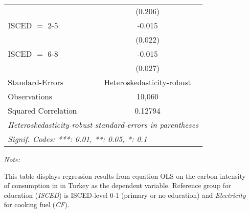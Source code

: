 \begin{table}[htbp!]
\begin{adjustbox}{width = 1\textwidth, max height = 0.95\textheight, center}
\begin{threeparttable}[b]
\begin{tabular}{lc}
                                & (0.206)\\   
            ISCED $=$ 2-5       & -0.015\\   
                                & (0.022)\\   
            ISCED $=$ 6-8       & -0.015\\   
                                & (0.027)\\   
            \midrule 
            Standard-Errors     & Heteroskedasticity-robust \\   
            Observations        & 10,060\\  
            Squared Correlation & 0.12794\\  
            \midrule \midrule
            \multicolumn{2}{l}{\emph{Heteroskedasticity-robust standard-errors in parentheses}}\\
            \multicolumn{2}{l}{\emph{Signif. Codes: ***: 0.01, **: 0.05, *: 0.1}}\\
         \end{tabular}
         
         \begin{tablenotes}\item \medskip \textit{Note:}
            \item This table displays regression results from equation OLS on the carbon intensity of consumption in  in Turkey as the dependent variable. Reference group for education (\textit{ISCED}) is ISCED-level 0-1 (primary or no education) and \textit{Electricity} for cooking fuel (\textit{CF}).
         \end{tablenotes}
      \end{threeparttable}
   \end{adjustbox}
\end{table}


